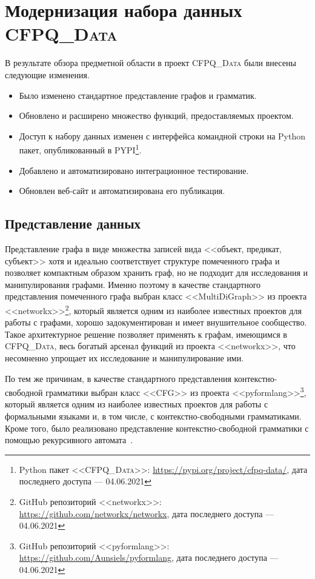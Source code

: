 \section{Модернизация набора данных \textsc{CFPQ\_Data}}

В результате обзора предметной области в проект \textsc{CFPQ\_Data} были внесены следующие изменения.
\begin{itemize}
    \item Было изменено стандартное представление графов и грамматик.
    \item Обновлено и расширено множество функций, предоставляемых проектом.
    \item Доступ к набору данных изменен с интерфейса командной строки на Python пакет, опубликованный в PYPI\footnote{Python пакет <<\textsc{CFPQ\_Data}>>: \url{https://pypi.org/project/cfpq-data/}, дата последнего доступа --- 04.06.2021}.
    \item Добавлено и автоматизировано интеграционное тестирование.
    \item Обновлен веб-сайт и автоматизирована его публикация.
\end{itemize}

\subsection{Представление данных}

Представление графа в виде множества записей вида <<объект, предикат, субъект>> хотя и идеально соответствует структуре помеченного графа и позволяет компактным образом хранить граф, но не подходит для исследования и манипулирования графами.
Именно поэтому в качестве стандартного представления помеченного графа выбран класс <<MultiDiGraph>> из проекта <<networkx>>\footnote{GitHub репозиторий <<networkx>>: \url{https://github.com/networkx/networkx}, дата последнего доступа --- 04.06.2021}, который является одним из наиболее известных проектов для работы с графами, хорошо задокументирован и имеет внушительное сообщество.
Такое архитектурное решение позволяет применять к графам, имеющимся в \textsc{CFPQ\_Data}, весь богатый арсенал функций из проекта <<networkx>>, что несомненно упрощает их исследование и манипулирование ими.

По тем же причинам, в качестве стандартного представления кон\-текстно-свобод\-ной грамматики выбран класс <<CFG>> из проекта <<py\-form\-lang>>\footnote{GitHub репозиторий <<py\-form\-lang>>: \url{https://github.com/Aunsiels/pyformlang}, дата последнего доступа --- 04.06.2021}, который является одним из наиболее известных проектов для работы с формальными языками и, в том числе, с контекстно-свободными грамматиками.
Кроме того, было реализовано представление контекстно-свободной грамматики с помощью рекурсивного автомата~\cite{RSM}.

